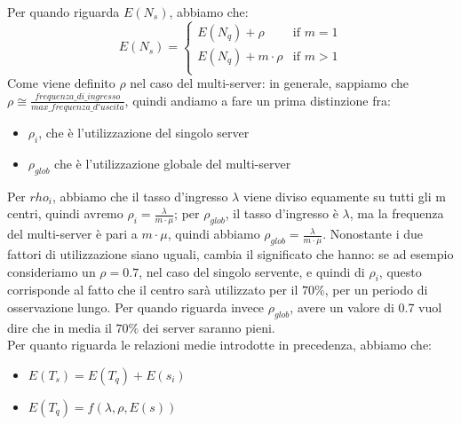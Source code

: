 \documentclass{article}
\begin{document}
Per quando riguarda $E(N_s)$, abbiamo che:
\[
E(N_s) =
\begin{cases}
E(N_q) + \rho & \text{if } m = 1\\
E(N_q) + m\cdot \rho & \text{if } m > 1\\
\end{cases}
\]
Come viene definito $\rho$ nel caso del multi-server: in generale, sappiamo che $\rho \cong \frac{frequenza\_di\_ingresso}{max\_frequenza\_d'uscita}$, quindi andiamo a fare un prima distinzione fra:
\begin{itemize}
\item $\rho_i$, che è l'utilizzazione del singolo server
\item $\rho_{glob}$ che è l'utilizzazione globale del multi-server
\end{itemize}
Per $rho_i$, abbiamo che il tasso d'ingresso $\lambda$ viene diviso equamente su tutti gli m centri, quindi avremo $\rho_i = \frac{\lambda}{m\cdot \mu}$; per $\rho_{glob}$, il tasso d'ingresso è $\lambda$, ma la frequenza del multi-server è pari a $m\cdot \mu$, quindi abbiamo $\rho_{glob} = \frac{\lambda}{m\cdot \mu}$. Nonostante i due fattori di utilizzazione siano uguali, cambia il significato che hanno: se ad esempio consideriamo un $\rho = 0.7$, nel caso del singolo servente, e quindi di $\rho_i$, questo corrisponde al fatto che il centro sarà utilizzato per il $70\%$, per un periodo di osservazione lungo. Per quando riguarda invece $\rho_{glob}$, avere un valore di 0.7 vuol dire che in media il $70\%$ dei server saranno pieni.\\ Per quanto riguarda le relazioni medie introdotte in precedenza, abbiamo che:
\begin{itemize}
\item $E(T_s) = E(T_q) + E(s_i)$
\item $E(T_q) = f(\lambda, \rho, E(s))$
\end{itemize}
\end{document}
